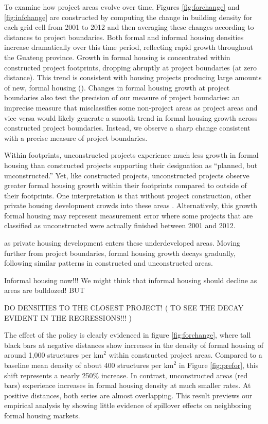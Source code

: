 \documentclass[12pt]{article}
\begin{document}
To examine how project areas evolve over time, Figures \ref{fig:forchange} and \ref{fig:infchange} are constructed by computing the change in building density for each grid cell from 2001 to 2012 and then averaging these changes according to distances to project boundaries.  Both formal and informal housing densities increase dramatically over this time period, reflecting rapid growth throughout the Guateng province.  Growth in formal housing is concentrated within constructed project footprints, dropping abruptly at project boundaries (at zero distance).   This trend is consistent with housing projects producing large amounts of new, formal housing (\cite{dhsreports}).  Changes in formal housing growth at project boundaries also test the precision of our measure of project boundaries:  an imprecise measure that misclassifies some non-project areas as project areas and vice versa would likely generate a smooth trend in formal housing growth across constructed project boundaries.  Instead, we observe a sharp change consistent with a precise measure of project boundaries.

Within footprints, unconstructed projects experience much less growth in formal housing than constructed projects supporting their designation as ``planned, but unconstructed.''  Yet, like constructed projects, unconstructed projects observe greater formal housing growth within their footprints compared to outside of their footprints.  One interpretation is that without project construction, other private housing development crowds into these areas .  Alternatively, this growth formal housing may represent measurement error where some projects that are classified as unconstructed were actually finished between 2001 and 2012.  

 as private housing development enters these underdeveloped areas.  Moving further from project boundaries, formal housing growth decays gradually, following similar patterns in constructed and unconstructed areas.

Informal housing now!!!   We might think that informal housing should decline as areas are bulldozed!  BUT 

DO DENSITIES TO THE CLOSEST PROJECT! ( TO SEE THE DECAY EVIDENT IN THE REGRESSIONS!!! )





The effect of the policy is clearly evidenced in figure \ref{fig:forchange}, where tall black bars at negative distances show increases in the density of formal housing of around 1,000 structures per $\text{km}^{2}$ within constructed project areas.  Compared to a baseline mean density of about 400 structures per $\text{km}^{2}$ in Figure \ref{fig:prefor}, this shift represents a nearly 250\% increase. In contrast, unconstructed areas (red bars) experience increases in formal housing density at much smaller rates.
At positive distances, both series are almost overlapping.  This result previews our empirical analysis by showing little evidence of spillover effects on neighboring formal housing markets.
\end{document}
